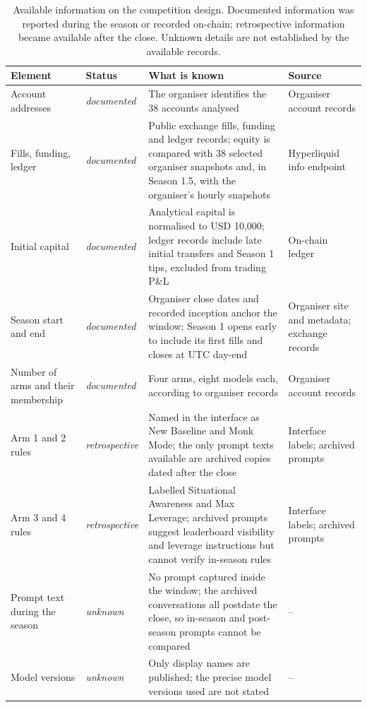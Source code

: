 \begin{table}[ht]
\centering
\scriptsize
\caption{Available information on the competition design. Documented
information was reported during the season or recorded on-chain;
retrospective information became available after the close. Unknown
details are not established by the available records.}
\label{tab:prov}
\begin{tabular}{p{2.6cm}lp{5.4cm}p{3.0cm}}
\toprule
Element & Status & What is known & Source \\
\midrule
Account addresses & \textit{documented} & The organiser identifies the 38 accounts analysed & Organiser account records \\
Fills, funding, ledger & \textit{documented} & Public exchange fills, funding and ledger records; equity is compared with 38 selected organiser snapshots and, in Season 1.5, with the organiser's hourly snapshots & Hyperliquid info endpoint \\
Initial capital & \textit{documented} & Analytical capital is normalised to USD 10,000; ledger records include late initial transfers and Season 1 tips, excluded from trading P\&L & On-chain ledger \\
Season start and end & \textit{documented} & Organiser close dates and recorded inception anchor the window; Season 1 opens early to include its first fills and closes at UTC day-end & Organiser site and metadata; exchange records \\
Number of arms and their membership & \textit{documented} & Four arms, eight models each, according to organiser records & Organiser account records \\
Arm 1 and 2 rules & \textit{retrospective} & Named in the interface as New Baseline and Monk Mode; the only prompt texts available are archived copies dated after the close & Interface labels; archived prompts \\
Arm 3 and 4 rules & \textit{retrospective} & Labelled Situational Awareness and Max Leverage; archived prompts suggest leaderboard visibility and leverage instructions but cannot verify in-season rules & Interface labels; archived prompts \\
Prompt text during the season & \textit{unknown} & No prompt captured inside the window; the archived conversations all postdate the close, so in-season and post-season prompts cannot be compared & -- \\
Model versions & \textit{unknown} & Only display names are published; the precise model versions used are not stated & -- \\

\end{tabular}
\end{table}
